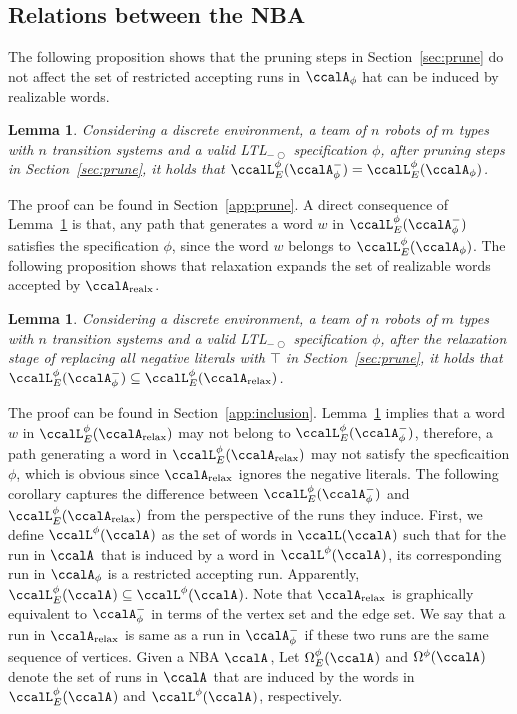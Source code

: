 \documentclass[Afour,sageh,times]{sagej}
\newtheorem{lem}[thm]{Lemma}
\newcommand{\ltl}{ {\it LTL}$_{-\bigcirc}$ }
\newcommand{\auto}[1]{\ccalA_{\textup{#1}}}
\newcommand{\autop}{\ccalA_{\phi}}
\begin{document}
{{  \subsection{Relations between the NBA}
  The following proposition shows that the pruning steps in Section~\ref{sec:prune} do not affect the set of restricted accepting runs  in $\autop$ hat can be induced by realizable words.
  \begin{lem}\label{prop:prune}
    Considering  a discrete environment, a team of $n$ robots of $m$ types with $n$ transition systems and a valid \ltl specification $\phi$, after pruning steps in Section~\ref{sec:prune}, it holds that  $\ccalL_E^\phi(\autop^-) = \ccalL^\phi_E(\autop)$.
  \end{lem}
    The proof can be found in Section~\ref{app:prune}. A direct consequence of Lemma~\ref{prop:prune} is that, any path that generates a word $w$ in  $\ccalL_E^\phi(\autop^-)$ satisfies the specification $\phi$, since the word $w$ belongs to $\ccalL^\phi_E(\autop)$. The following proposition shows that relaxation expands the set of realizable words accepted by $\auto{realx}$.
  \begin{lem}\label{prop:inclusion}
 Considering  a discrete environment, a team of $n$ robots of $m$ types with $n$ transition systems and a valid \ltl specification $\phi$, after the relaxation stage of replacing all negative literals with $\top$ in Section~\ref{sec:prune}, it holds that $\ccalL^\phi_E(\autop^-) \subseteq \ccalL^\phi_E(\auto{relax})$.
  \end{lem}
  The proof can be found in Section~\ref{app:inclusion}. Lemma~\ref{prop:inclusion} implies that a word $w$ in $\ccalL^\phi_E(\auto{relax})$ may not belong to $\ccalL^\phi_E(\autop^-)$, therefore, a path generating a word in $\ccalL^\phi_E(\auto{relax})$ may not satisfy the specficaition $\phi$, which is obvious since $\auto{relax}$ ignores the negative literals. The following corollary captures the difference between $\ccalL^\phi_E(\autop^-) $ and $\ccalL^\phi_E(\auto{relax})$ from the perspective of the runs they induce. First, we define $\ccalL^\phi(\auto{})$ as the set of  words in $\ccalL(\auto{})$ such that for the run in $\auto{}$ that is induced by a word in $\ccalL^\phi(\auto{})$, its corresponding run in $\autop$ is a restricted accepting run. Apparently, $\ccalL_E^\phi(\auto{})  \subseteq \ccalL^\phi(\auto{})$.  Note that   $\auto{relax}$ is graphically equivalent to $\autop^-$ in terms of the vertex set and the edge set. We say that a run in $\auto{relax}$ is same as a run in $\autop^-$ if these two runs are the same sequence of vertices. Given a NBA $\auto{}$, Let $\Omega_E^\phi(\auto{})$ and $\Omega^\phi(\auto{})$ denote the set of runs in $\auto{}$ that are induced by the words in $\ccalL_E^\phi(\auto{})$ and $\ccalL^\phi(\auto{})$, respectively.
}}
\end{document}
